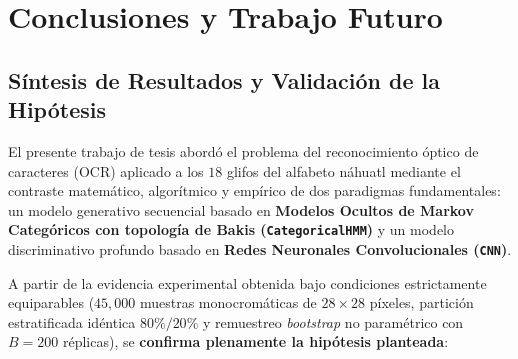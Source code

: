 \documentclass[
  spanish,
  us-letterpaper,
]{scrreprt}
\theoremstyle{definition}
\theoremstyle{remark}
\begin{document}

\chapter{Conclusiones y Trabajo
Futuro}\label{conclusiones-y-trabajo-futuro}

\section{Síntesis de Resultados y Validación de la
Hipótesis}\label{suxedntesis-de-resultados-y-validaciuxf3n-de-la-hipuxf3tesis}

El presente trabajo de tesis abordó el problema del reconocimiento
óptico de caracteres (OCR) aplicado a los \(18\) glifos del alfabeto
náhuatl mediante el contraste matemático, algorítmico y empírico de dos
paradigmas fundamentales: un modelo generativo secuencial basado en
\textbf{Modelos Ocultos de Markov Categóricos con topología de Bakis
(\texttt{CategoricalHMM})} y un modelo discriminativo profundo basado en
\textbf{Redes Neuronales Convolucionales (\texttt{CNN})}.

A partir de la evidencia experimental obtenida bajo condiciones
estrictamente equiparables (\(45{,}000\) muestras monocromáticas de
\(28 \times 28\) píxeles, partición estratificada idéntica
\(80\% / 20\%\) y remuestreo \emph{bootstrap} no paramétrico con
\(B = 200\) réplicas), se \textbf{confirma plenamente la hipótesis
planteada}:
\end{document}

